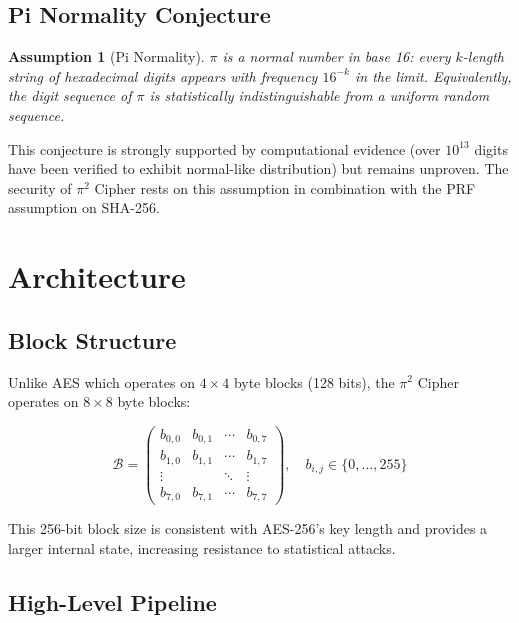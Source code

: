 \documentclass[12pt, a4paper]{article}
\newtheorem{assumption}{Assumption}[section]
\newcommand{\block}{\mathcal{B}}
\begin{document}
\subsection{Pi Normality Conjecture}

\begin{assumption}[Pi Normality]\label{ass:normal}
$\pi$ is a normal number in base 16: every $k$-length string of hexadecimal digits appears with frequency $16^{-k}$ in the limit. Equivalently, the digit sequence of $\pi$ is statistically indistinguishable from a uniform random sequence.
\end{assumption}

This conjecture is strongly supported by computational evidence (over $10^{13}$ digits have been verified to exhibit normal-like distribution) but remains unproven. The security of $\pi^2$ Cipher rests on this assumption in combination with the PRF assumption on SHA-256.

\section{Architecture}\label{sec:architecture}

\subsection{Block Structure}

Unlike AES which operates on $4 \times 4$ byte blocks (128 bits), the $\pi^2$ Cipher operates on $8 \times 8$ byte blocks:

\begin{equation}
  \block = \begin{pmatrix}
    b_{0,0} & b_{0,1} & \cdots & b_{0,7} \\
    b_{1,0} & b_{1,1} & \cdots & b_{1,7} \\
    \vdots  &         & \ddots & \vdots  \\
    b_{7,0} & b_{7,1} & \cdots & b_{7,7}
  \end{pmatrix}, \quad b_{i,j} \in \{0,\ldots,255\}
\end{equation}

This 256-bit block size is consistent with AES-256's key length and provides a larger internal state, increasing resistance to statistical attacks.

\subsection{High-Level Pipeline}
\end{document}

